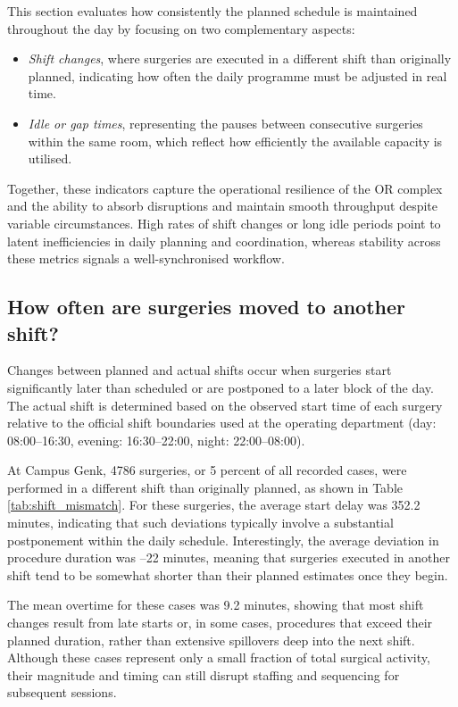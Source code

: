 \documentclass[
]{article}
\providecommand{\tightlist}{%
  \setlength{\itemsep}{0pt}\setlength{\parskip}{0pt}}
\begin{document}
This section evaluates how consistently the planned schedule is
maintained throughout the day by focusing on two complementary aspects:

\begin{itemize}
\tightlist
\item
  \emph{Shift changes}, where surgeries are executed in a different
  shift than originally planned, indicating how often the daily
  programme must be adjusted in real time.
\item
  \emph{Idle or gap times}, representing the pauses between consecutive
  surgeries within the same room, which reflect how efficiently the
  available capacity is utilised.
\end{itemize}

Together, these indicators capture the operational resilience of the OR
complex and the ability to absorb disruptions and maintain smooth
throughput despite variable circumstances. High rates of shift changes
or long idle periods point to latent inefficiencies in daily planning
and coordination, whereas stability across these metrics signals a
well-synchronised workflow.

\subsection{How often are surgeries moved to another
shift?}\label{how-often-are-surgeries-moved-to-another-shift}

Changes between planned and actual shifts occur when surgeries start
significantly later than scheduled or are postponed to a later block of
the day. The actual shift is determined based on the observed start time
of each surgery relative to the official shift boundaries used at the
operating department (day: 08:00--16:30, evening: 16:30--22:00, night:
22:00--08:00).

At Campus Genk, 4786 surgeries, or 5 percent of all recorded cases, were
performed in a different shift than originally planned, as shown in
Table \ref{tab:shift_mismatch}. For these surgeries, the average start
delay was 352.2 minutes, indicating that such deviations typically
involve a substantial postponement within the daily schedule.
Interestingly, the average deviation in procedure duration was --22
minutes, meaning that surgeries executed in another shift tend to be
somewhat shorter than their planned estimates once they begin.

The mean overtime for these cases was 9.2 minutes, showing that most
shift changes result from late starts or, in some cases, procedures that
exceed their planned duration, rather than extensive spillovers deep
into the next shift. Although these cases represent only a small
fraction of total surgical activity, their magnitude and timing can
still disrupt staffing and sequencing for subsequent sessions.
\end{document}
